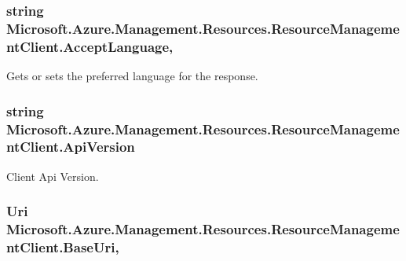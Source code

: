\subsubsection[{\texorpdfstring{Accept\+Language}{AcceptLanguage}}]{\setlength{\rightskip}{0pt plus 5cm}string Microsoft.\+Azure.\+Management.\+Resources.\+Resource\+Management\+Client.\+Accept\+Language\hspace{0.3cm}{\ttfamily [get]}, {\ttfamily [set]}}\hypertarget{class_microsoft_1_1_azure_1_1_management_1_1_resources_1_1_resource_management_client_af3643c8e63b7c9f85c7c323f216f08c9}{}\label{class_microsoft_1_1_azure_1_1_management_1_1_resources_1_1_resource_management_client_af3643c8e63b7c9f85c7c323f216f08c9}


Gets or sets the preferred language for the response. 

\subsubsection[{\texorpdfstring{Api\+Version}{ApiVersion}}]{\setlength{\rightskip}{0pt plus 5cm}string Microsoft.\+Azure.\+Management.\+Resources.\+Resource\+Management\+Client.\+Api\+Version\hspace{0.3cm}{\ttfamily [get]}}\hypertarget{class_microsoft_1_1_azure_1_1_management_1_1_resources_1_1_resource_management_client_aea51a4e00dde5b781e6f692e1ae2bc46}{}\label{class_microsoft_1_1_azure_1_1_management_1_1_resources_1_1_resource_management_client_aea51a4e00dde5b781e6f692e1ae2bc46}


Client Api Version. 

\subsubsection[{\texorpdfstring{Base\+Uri}{BaseUri}}]{\setlength{\rightskip}{0pt plus 5cm}Uri Microsoft.\+Azure.\+Management.\+Resources.\+Resource\+Management\+Client.\+Base\+Uri\hspace{0.3cm}{\ttfamily [get]}, {\ttfamily [set]}}\hypertarget{class_microsoft_1_1_azure_1_1_management_1_1_resources_1_1_resource_management_client_a12157fa76c86043c0bbbc1bfbaf9f943}{}\label{class_microsoft_1_1_azure_1_1_management_1_1_resources_1_1_resource_management_client_a12157fa76c86043c0bbbc1bfbaf9f943}


